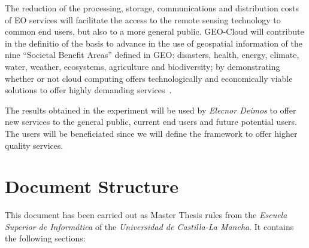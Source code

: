 The reduction of the processing, storage, communications and distribution costs
of \ac{EO} services will facilitate the access to the remote sensing technology to
common end users, but also to a more general public. GEO-Cloud will contribute
in the definitio of the basis to advance in the use of geospatial information of the nine
``Societal Benefit Areas'' defined in GEO: disasters, health, energy, climate,
water, weather, ecosystems, agriculture and biodiversity; by demonstrating
whether or not cloud computing offers technologically and economically viable
solutions to offer highly demanding services~\cite{Ge2009}.

The results obtained in the experiment will be used by \emph{Elecnor Deimos} to offer new
services to the general public, current end users and future potential users. The users will be beneficiated since we will define the framework to
offer higher quality services.




\section{Document Structure}

This document has been carried out as Master Thesis rules from the \emph{Escuela
Superior de Informática} of the \emph{Universidad de Castilla-La Mancha}. It contains
the following sections:


